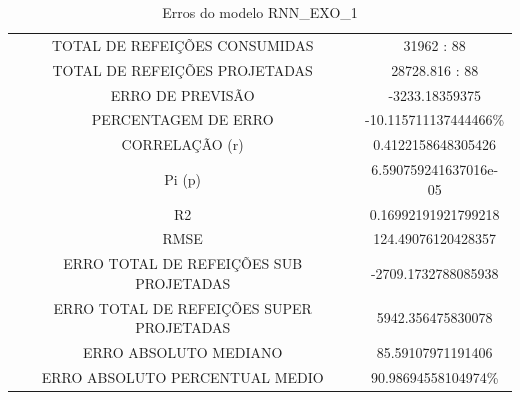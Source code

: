 \documentclass[	12pt, Times, openright, twoside, a4paper, english, brazil]{abntex2}
\begin{document}
                \begin{table}[!ht]
                \centering
                \caption{Erros do modelo  RNN\_EXO\_1 }
                    \begin{tabular}{|c|c|}
                    \rowcolor{gray!50}
                    \hline
                \multicolumn{2}{c}{RNN\_EXO\_1:} \\
                \hline
                TOTAL DE REFEIÇÕES CONSUMIDAS & 31962 : 88  \\
                TOTAL DE REFEIÇÕES PROJETADAS & 28728.816 : 88  \\
                ERRO DE PREVISÃO & -3233.18359375 \\
                PERCENTAGEM DE ERRO & -10.115711137444466\%  \\
                CORRELAÇÃO (r) & 0.4122158648305426 \\ Pi (p) & 6.590759241637016e-05\\ R2 & 0.16992191921799218\\
                RMSE & 124.49076120428357\\
                ERRO TOTAL DE REFEIÇÕES SUB PROJETADAS & -2709.1732788085938\\
                ERRO TOTAL DE REFEIÇÕES SUPER PROJETADAS & 5942.356475830078\\
                ERRO ABSOLUTO MEDIANO & 85.59107971191406\\
                ERRO ABSOLUTO PERCENTUAL MEDIO & 90.98694558104974\% \\ \hline \end{tabular} \end{table}
                
\end{document}
